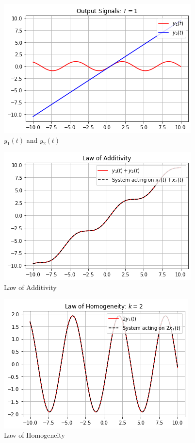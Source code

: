\documentclass[journal,12pt,twocolumn]{IEEEtran}
\begin{document}
\begin{figure}[!ht]
\centering
 \includegraphics[width=\columnwidth]{graphs/output_signals.png}
 \caption{$y_1(t)$ and  $y_2(t)$}
 \end{figure}
 \begin{figure}[!ht]
\centering
 \includegraphics[width=\columnwidth]{graphs/law_of_additivity.png}
 \caption{Law of Additivity}
 \end{figure}
 \begin{figure}[!ht]
\centering
 \includegraphics[width=\columnwidth]{graphs/law_of_homogeneity.png}
 \caption{Law of Homogeneity}
 \end{figure}
\end{document}
